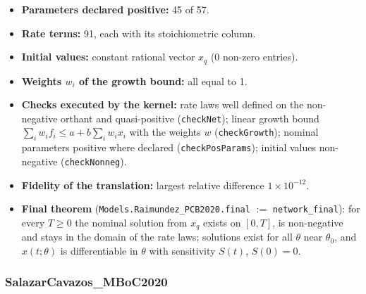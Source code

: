 \begin{itemize}
\item \textbf{Parameters declared positive:} 45 of 57.
\item \textbf{Rate terms:} 91, each with its stoichiometric column.
\item \textbf{Initial values:} constant rational vector $x_q$ (0 non-zero entries).
\item \textbf{Weights $w_i$ of the growth bound:} all equal to 1.
\item \textbf{Checks executed by the kernel:} rate laws well defined on the non-negative orthant and quasi-positive (\texttt{checkNet}); linear growth bound $\sum_iw_if_i\le a+b\sum_iw_ix_i$ with the weights $w$ (\texttt{checkGrowth}); nominal parameters positive where declared (\texttt{checkPosParams}); initial values non-negative (\texttt{checkNonneg}).
\item \textbf{Fidelity of the translation:} largest relative difference $1\times10^{-12}$.
\item \textbf{Final theorem} (\texttt{Models.Raimundez\_PCB2020.final} $:=$ \texttt{network\_final}): for every $T\ge0$ the nominal solution from $x_q$ exists on $[0,T]$, is non-negative and stays in the domain of the rate laws; solutions exist for all $\theta$ near $\theta_0$, and $x(t;\theta)$ is differentiable in $\theta$ with sensitivity $S(t)$, $S(0)=0$.
\end{itemize}

\subsubsection*{SalazarCavazos\_MBoC2020}

